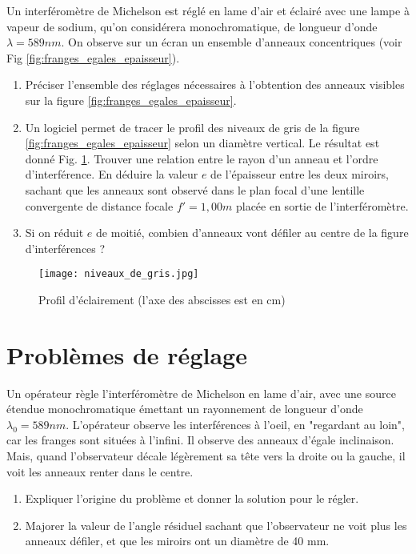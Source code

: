 \documentclass{article}
\begin{document}
Un interféromètre de Michelson est réglé en lame d'air et éclairé avec une lampe à vapeur de sodium, qu'on considérera monochromatique, de longueur d'onde $\lambda = 589nm$.
On observe sur un écran un ensemble d'anneaux concentriques (voir Fig \ref{fig:franges_egales_epaisseur}). 
\begin{enumerate}
  \item Préciser l'ensemble des réglages nécessaires à l'obtention des anneaux visibles sur la figure \ref{fig:franges_egales_epaisseur}. 
  \item Un logiciel permet de tracer le profil des niveaux de gris de la figure \ref{fig:franges_egales_epaisseur} selon un diamètre vertical. Le résultat est donné Fig. \ref{fig:niveaux_de_gris}. Trouver une relation entre le rayon d'un anneau et l'ordre d'interférence. En déduire la valeur $e$ de l'épaisseur entre les deux miroirs, sachant que les anneaux sont observé dans le plan focal d'une lentille convergente de distance focale $f'=1,00m$ placée en sortie de l'interféromètre.
  \item Si on réduit $e$ de moitié, combien d'anneaux vont défiler au centre de la figure d'interférences ?  
\end{enumerate}

\begin{figure}[h]
  \centering
  \texttt{[image: niveaux\_de\_gris.jpg]}
  \caption{Profil d'éclairement (l'axe des abscisses est en cm)}   
  \label{fig:niveaux_de_gris}
\end{figure}

\section{Problèmes de réglage}
Un opérateur règle l'interféromètre de Michelson en lame d'air, avec une source étendue monochromatique émettant un rayonnement de longueur d'onde $\lambda_0 = 589 nm$. 
L'opérateur observe les interférences à l'oeil, en "regardant au loin", car les franges sont situées à l'infini.
Il observe des anneaux d'égale inclinaison. 
Mais, quand l'observateur décale légèrement sa tête vers la droite ou la gauche, il voit les anneaux renter dans le centre. 
\begin{enumerate}
  \item Expliquer l'origine du problème et donner la solution pour le régler. 
  \item Majorer la valeur de l'angle résiduel sachant que l'observateur ne voit plus les anneaux défiler, et que les miroirs ont un diamètre de 40 mm. 
\end{enumerate}
\end{document}
